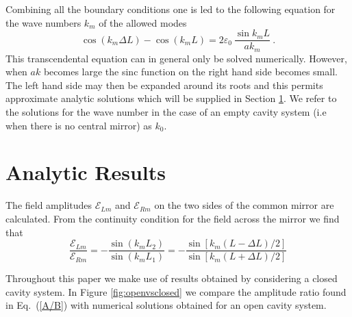 \documentclass[twocolumn,english,pra,aps,superscriptaddress,floatfix]{revtex4-1}
\begin{document}
Combining all the boundary conditions one is led to the following equation
for the wave numbers $k_{m}$ of the allowed modes \cite{lang73}
\begin{equation}
\cos(k_{m} \Delta L)-\cos(k_{m} L)=2\varepsilon_{0} \ \frac{\sin k_{m} L}{a k_{m}} \ .
\label{transcendental}
\end{equation}
This transcendental equation can in general only be solved numerically. However, when $a k$ becomes large the sinc function on the right hand side becomes small. The left hand side may then be expanded around its roots and this permits approximate analytic solutions which will be supplied in Section \ref{sec:AnalyticExpressions}.
We refer to the solutions for the wave number in the case of an empty cavity system (i.e when there is no central mirror) as $k_0$.




\section{Analytic Results}
\label{sec:AnalyticExpressions}



The field amplitudes $\mathcal{E}_{Lm}$ and $\mathcal{E}_{Rm}$ on the two sides of the common mirror are calculated.  From the continuity condition for the field across the mirror we find that   
\begin{equation}
\frac{\mathcal{E}_{Lm}}{\mathcal{E}_{Rm}}=-\frac{\sin(k_{m}L_{2})}{\sin(k_{m}L_{1})} = -\frac{\sin [k_{m} (L-\Delta L)/2]}{\sin[k_{m}(L+\Delta L)/2]} 
\label{A/B} 
\end{equation}

Throughout this paper we make use of results obtained by considering a closed cavity system.  In  Figure \ref{fig:openvsclosed} we compare the amplitude ratio found in Eq.\ (\ref{A/B}) with numerical solutions obtained for an open cavity system.
\end{document}
